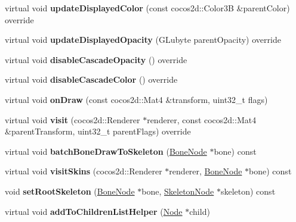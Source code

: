 \begin{DoxyCompactItemize}
virtual void {\bfseries update\+Displayed\+Color} (const cocos2d\+::\+Color3B \&parent\+Color) override
\item 
\mbox{\label{classBoneNode_a96677a159fda46b9a4944bcaa22c4bb6}} 
virtual void {\bfseries update\+Displayed\+Opacity} (G\+Lubyte parent\+Opacity) override
\item 
\mbox{\label{classBoneNode_a53915a74c0aaada6187c812c4c83f215}} 
virtual void {\bfseries disable\+Cascade\+Opacity} () override
\item 
\mbox{\label{classBoneNode_a89c1e1958baa0c0f857acfdc4133b506}} 
virtual void {\bfseries disable\+Cascade\+Color} () override
\item 
\mbox{\label{classBoneNode_af9e2165a7a0be18ccf576d16680e2145}} 
virtual void {\bfseries on\+Draw} (const cocos2d\+::\+Mat4 \&transform, uint32\+\_\+t flags)
\item 
\mbox{\label{classBoneNode_a0d15e446eef80d6fdd5da497275ccc26}} 
virtual void {\bfseries visit} (cocos2d\+::\+Renderer $\ast$renderer, const cocos2d\+::\+Mat4 \&parent\+Transform, uint32\+\_\+t parent\+Flags) override
\item 
\mbox{\label{classBoneNode_ac4ee968894e0eef4f1ebfb1133042def}} 
virtual void {\bfseries batch\+Bone\+Draw\+To\+Skeleton} (\hyperlink{classBoneNode}{Bone\+Node} $\ast$bone) const
\item 
\mbox{\label{classBoneNode_a661cc425cdbe0955f1be14f7b6d118ea}} 
virtual void {\bfseries visit\+Skins} (cocos2d\+::\+Renderer $\ast$renderer, \hyperlink{classBoneNode}{Bone\+Node} $\ast$bone) const
\item 
\mbox{\label{classBoneNode_aaba98257bace256f845607bbf9d0e329}} 
void {\bfseries set\+Root\+Skeleton} (\hyperlink{classBoneNode}{Bone\+Node} $\ast$bone, \hyperlink{classSkeletonNode}{Skeleton\+Node} $\ast$skeleton) const
\item 
\mbox{\label{classBoneNode_ab1aeebe147fdc25054e5adc207e6aa14}} 
virtual void {\bfseries add\+To\+Children\+List\+Helper} (\hyperlink{classNode}{Node} $\ast$child)

\end{DoxyCompactItemize}
